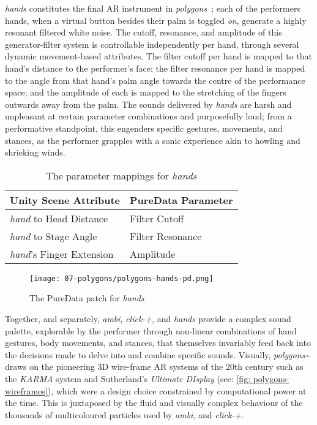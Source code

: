 \textit{hands} constitutes the final AR instrument in \textit{polygons~}; each of the performers hands, when a virtual button besides their palm is toggled \textit{on}, generate a highly resonant filtered white noise. The cutoff, resonance, and amplitude of this generator-filter system is controllable independently per hand, through several dynamic movement-based attributes. The filter cutoff per hand is mapped to that hand's distance to the performer's face; the filter resonance per hand is mapped to the angle from that hand's palm angle towards the centre of the performance space; and the amplitude of each is mapped to the stretching of the fingers outwards away from the palm. The sounds delivered by \textit{hands} are harsh and unpleasant at certain parameter combinations and purposefully loud; from a performative standpoint, this engenders specific gestures, movements, and stances, as the performer grapples with a sonic experience akin to howling and shrieking winds.
\begin{table}
    \centering
    \begin{tabular}{ l|l }
        \textbf{Unity Scene Attribute}         & \textbf{PureData Parameter}    \\
        \hline      
        \textit{hand} to Head Distance         & Filter Cutoff                  \\
        \textit{hand} to Stage Angle           & Filter Resonance               \\
        \textit{hand}'s Finger Extension       & Amplitude               
    \end{tabular}
    \caption{The parameter mappings for \textit{hands}}
    \label{fig: polygons-hands-mapping}
\end{table}
\begin{figure}
    \centering
    \texttt{[image: 07-polygons/polygons-hands-pd.png]}
    \caption{The PureData patch for \textit{hands}}
    \label{fig: polygons-hands-pd}
\end{figure}

Together, and separately, \textit{ambi}, \textit{click-+}, and \textit{hands} provide a complex sound palette, explorable by the performer through non-linear combinations of hand gestures, body movements, and stances, that themselves invariably feed back into the decisions made to delve into and combine specific sounds. Visually, \textit{polygons\textasciitilde{}} draws on the pioneering 3D wire-frame AR systems of the 20th century such as the \textit{KARMA} system \citep{feiner1993} and Sutherland's \textit{Ultimate DIsplay} \citeyearpar{sutherland1968} (see: \autoref{fig: polygons-wireframes}), which were a design choice constrained by computational power at the time. This is juxtaposed by the fluid and visually complex behaviour of the thousands of multicoloured particles used by \textit{ambi}, and \textit{click-+}.

